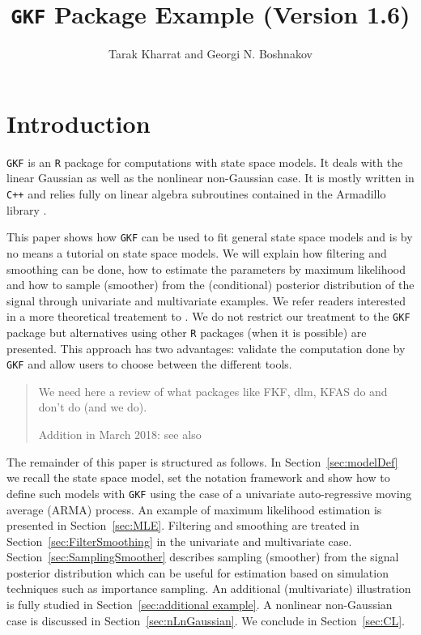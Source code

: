 \documentclass{article}
\newcommand{\R}{\texttt{R}\xspace}
\newcommand{\GKF}{\texttt{GKF}\xspace}
\newenvironment{comment}{%
  \begin{quote}\color{red}\begin{sffamily}}
 {\end{sffamily}\color{black}\end{quote}}
\begin{document}

\title{\GKF Package Example (Version 1.6)}
\author{Tarak Kharrat and Georgi N. Boshnakov}
\maketitle


\section*{Introduction}

\GKF is an \R package for computations with state space models. It deals with the linear
Gaussian as well as the nonlinear non-Gaussian case. It is mostly written in \texttt{C++} and
relies fully on linear algebra subroutines contained in the Armadillo library
\citep{sanderson2010armadillo}.

This paper shows how \GKF can be used to fit general state space models and is by no means a
tutorial on state space models. We will explain how filtering and smoothing can be done, how
to estimate the parameters by maximum likelihood and how to sample (smoother) from the
(conditional) posterior distribution of the signal through univariate and multivariate
examples. We refer readers interested in a more theoretical treatement to
\citet{durbin2012time}. We do not restrict our treatment to the \GKF package but alternatives
using other \R packages (when it is possible) are presented. This approach has two
advantages: validate the computation done by \GKF and allow users to choose between the
different tools.

\begin{comment}
  We need here a review of what packages like FKF, dlm, KFAS do and don't do (and we do).

  Addition in March 2018: see also \citet{KFASjss2017}
\end{comment}

The remainder of this paper is structured as follows. In Section~\ref{sec:modelDef} we recall
the state space model, set the notation framework and show how to define such models with
\GKF using the case of a univariate auto-regressive moving average (ARMA) process. An example
of maximum likelihood estimation is presented in Section~\ref{sec:MLE}. Filtering and
smoothing are treated in Section~\ref{sec:FilterSmoothing} in the univariate and multivariate
case. Section~\ref{sec:SamplingSmoother} describes sampling (smoother) from the signal
posterior distribution which can be useful for estimation based on simulation techniques such
as importance sampling. An additional (multivariate) illustration is fully studied in
Section~\ref{sec:additional example}. A nonlinear non-Gaussian case is discussed in
Section~\ref{sec:nLnGaussian}. We conclude in Section~\ref{sec:CL}.
\end{document}
